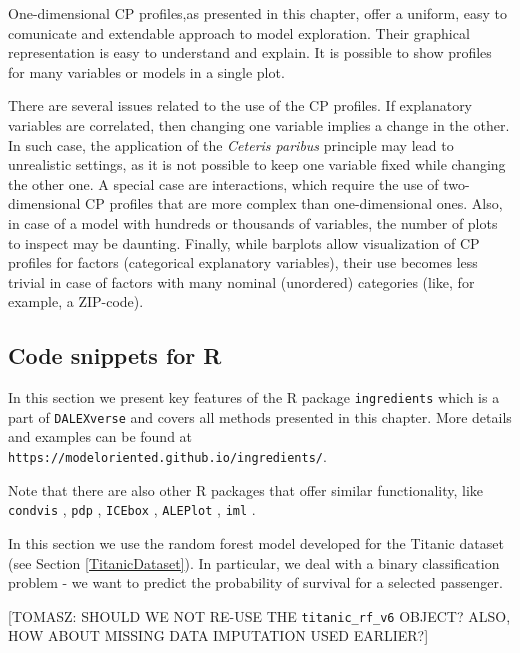 \documentclass[12pt,]{krantz}
\theoremstyle{definition}
\theoremstyle{definition}
\theoremstyle{definition}
\theoremstyle{remark}
\begin{document}
One-dimensional CP profiles,as presented in this chapter, offer a
uniform, easy to comunicate and extendable approach to model
exploration. Their graphical representation is easy to understand and
explain. It is possible to show profiles for many variables or models in
a single plot.

There are several issues related to the use of the CP profiles. If
explanatory variables are correlated, then changing one variable implies
a change in the other. In such case, the application of the
\emph{Ceteris paribus} principle may lead to unrealistic settings, as it
is not possible to keep one variable fixed while changing the other one.
A special case are interactions, which require the use of
two-dimensional CP profiles that are more complex than one-dimensional
ones. Also, in case of a model with hundreds or thousands of variables,
the number of plots to inspect may be daunting. Finally, while barplots
allow visualization of CP profiles for factors (categorical explanatory
variables), their use becomes less trivial in case of factors with many
nominal (unordered) categories (like, for example, a ZIP-code).

\hypertarget{code-snippets-for-r}{%
\subsection{Code snippets for R}\label{code-snippets-for-r}}

In this section we present key features of the R package
\texttt{ingredients} \citep{ingredientsRPackage} which is a part of
\texttt{DALEXverse} and covers all methods presented in this chapter.
More details and examples can be found at
\texttt{https://modeloriented.github.io/ingredients/}.

Note that there are also other R packages that offer similar
functionality, like \texttt{condvis} \citep{JSSv081i05}, \texttt{pdp}
\citep{pdpRPackage}, \texttt{ICEbox} \citep{ICEboxRPackage},
\texttt{ALEPlot} \citep{ALEPlotRPackage}, \texttt{iml}
\citep{imlRPackage}.

In this section we use the random forest \citep{R-randomForest} model
developed for the Titanic dataset (see Section \ref{TitanicDataset}). In
particular, we deal with a binary classification problem - we want to
predict the probability of survival for a selected passenger.

{[}TOMASZ: SHOULD WE NOT RE-USE THE \texttt{titanic\_rf\_v6} OBJECT?
ALSO, HOW ABOUT MISSING DATA IMPUTATION USED EARLIER?{]}
\end{document}
